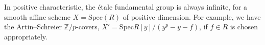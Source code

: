 \begin{remark}
\label{remark-sc} 
In positive characteristic, the \'etale fundamental group is always infinite, for a smooth affine scheme $X= \text{Spec}(R)$ of positive dimension. For example, we have the Artin--Schreier $\mathbb Z/p$-covers, $X'=\text{Spec} R[y]/(y^p-y-f)$, if $f\in R$ is chosen appropriately.
\end{remark}














